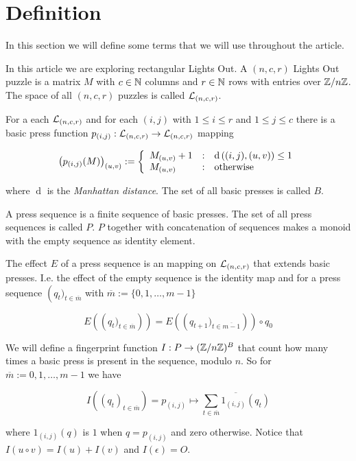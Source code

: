 \section{Definition}
In this section we will define some terms that we will use throughout the article.

In this article we are exploring rectangular Lights Out. A $(n, c, r)$ Lights Out puzzle
is a matrix $M$ with $c\in\mathbb{N}$ columns and $r\in\mathbb{N}$ rows with entries over $\mathbb{Z}/n\mathbb{Z}$. The space
of all $(n, c, r)$ puzzles is called $\mathcal{L}_{(n,c,r)}$.

For a each $\mathcal{L}_{(n,c,r)}$ and for each $(i, j)$ with $1\leq i \leq r$ and $1\leq j \leq c$
there is a basic press function $p_{(i,j)}: \mathcal{L}_{(n,c,r)} \rightarrow \mathcal{L}_{(n,c,r)}$ mapping

\[
    \left(p_{(i,j)}(M)\right)_{(u,v)} :=
    \left\{
    \begin{array}{l@{\quad:\quad}l}
        M_{(u,v)} + 1 & \operatorname{d}\left((i,j), (u,v)\right) \leq 1 \\
        M_{(u,v)} & \text{otherwise}
    \end{array}
    \right.
\]

where $\operatorname{d}$ is the \emph{Manhattan distance}. The set of all basic presses is called $B$.

A press sequence is a finite sequence of basic presses. The set of all press sequences is called $P$.
$P$ together with concatenation of sequences makes a monoid with the empty sequence as identity element.

The effect $E$ of a press sequence is an mapping on $\mathcal{L}_{(n,c,r)}$ that extends basic presses.
I.e. the effect of the empty sequence is the identity map and for a press sequence $\left(q_{t})_{t\in\overline{m}}$
with $\overline{m}:=\{0, 1, \ldots, m-1\}$ 

\[
    E\left(\left(q_{t})_{t\in\overline{m}}\right)\right)
    =
    E\left(\left(q_{t+1})_{t\in\overline{m-1}}\right)\right) \circ q_{0}
\]

We will define a fingerprint function $I: P \rightarrow (\mathbb{Z}/n\mathbb{Z})^{B}$ that count how many times a basic press
is present in the sequence, modulo $n$. So for $\overline{m}:={0, 1, \ldots, m-1}$ we have

\[
    I\left((q_t)_{t\in\overline{m}}\right)
    =
    p_{(i,j)} \mapsto \overline{\sum_{t\in\overline{m}}1_{(i,j)}(q_{t})}
\]

where $1_{(i,j)}(q)$ is $1$ when $q=p_{(i,j)}$ and zero otherwise. Notice that $I(u\circ v) = I(u) + I(v)$ and $I(\epsilon) = O$.

